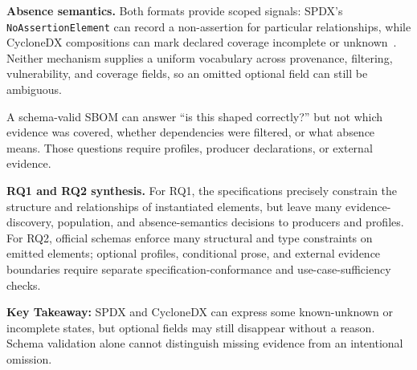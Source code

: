 \textbf{Absence semantics.} Both formats provide scoped signals: SPDX's \texttt{NoAssertionElement} can record a non-assertion for particular relationships, while CycloneDX compositions can mark declared coverage incomplete or unknown~\cite{spdx301,ecma424}. Neither mechanism supplies a uniform vocabulary across provenance, filtering, vulnerability, and coverage fields, so an omitted optional field can still be ambiguous.

A schema-valid SBOM can answer ``is this shaped correctly?'' but not which evidence was covered, whether dependencies were filtered, or what absence means. Those questions require profiles, producer declarations, or external evidence.

\textbf{RQ1 and RQ2 synthesis.} For RQ1, the specifications precisely constrain the structure and relationships of instantiated elements, but leave many evidence-discovery, population, and absence-semantics decisions to producers and profiles. For RQ2, official schemas enforce many structural and type constraints on emitted elements; optional profiles, conditional prose, and external evidence boundaries require separate specification-conformance and use-case-sufficiency checks.

\begin{tcolorbox}[colback=gray!4!white, colframe=black!80, boxrule=0.5pt, arc=5pt, left=2pt, right=2pt, top=1pt, bottom=1pt]
\textbf{Key Takeaway:} SPDX and CycloneDX can express some known-unknown or incomplete states, but optional fields may still disappear without a reason. Schema validation alone cannot distinguish missing evidence from an intentional omission.
\end{tcolorbox}

